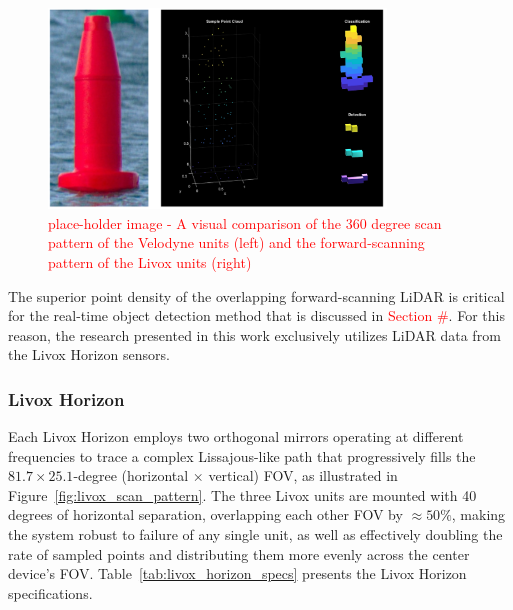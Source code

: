 \documentclass{erauthesis}
\begin{document}
\begin{figure}[htbp]
\centering
\includegraphics[width=0.8\textwidth]{Images/LiDAR_compare.png}
\caption{\textcolor{red}{place-holder image - A visual comparison of the 360 degree scan pattern of the Velodyne units (left) and the forward-scanning pattern of the Livox units (right)} }
\label{fig:lidar_scan_compare}
\end{figure}

The superior point density of the overlapping forward-scanning  LiDAR is critical for the real-time object detection method that is discussed in \textcolor{red}{Section \#}.
For this reason, the research presented in this work exclusively utilizes LiDAR data from the Livox Horizon sensors.

\subsubsection{Livox Horizon} \label{sensors_livox}

Each Livox Horizon employs two orthogonal mirrors operating at different frequencies to trace a complex Lissajous-like path that progressively fills the $81.7 \times 25.1$-degree (horizontal × vertical) \ac{FOV}, as illustrated in Figure~\ref{fig:livox_scan_pattern}. 
The three Livox units are mounted with 40 degrees of horizontal separation, overlapping each other \ac{FOV} by $\approx 50\%$, making the system robust to failure of any single unit, as well as effectively doubling the rate of sampled points and distributing them more evenly across the center device's \ac{FOV}. 
Table~\ref{tab:livox_horizon_specs} presents the Livox Horizon specifications.

\end{document}

